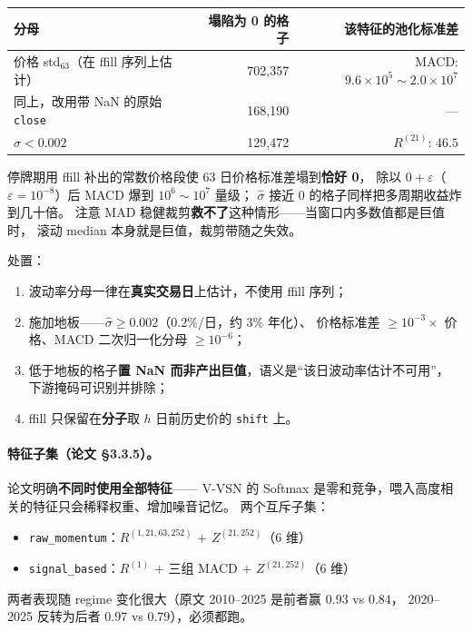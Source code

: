\documentclass[11pt, a4paper]{ctexart}
\newcommand{\file}[1]{\texttt{\small #1}}
\begin{document}
\begin{table}[h]
\centering
\small
\begin{tabular}{lrr}
\toprule
分母 & 塌陷为 0 的格子 & 该特征的池化标准差 \\
\midrule
价格 std$_{63}$（在 ffill 序列上估计） & 702{,}357 & MACD: $9.6\times10^5 \sim 2.0\times10^7$ \\
同上，改用带 NaN 的原始 \file{close} & 168{,}190 & --- \\
$\hat\sigma < 0.002$ & 129{,}472 & $R^{(21)}$: $46.5$ \\
\bottomrule
\end{tabular}
\end{table}

\noindent
停牌期用 ffill 补出的常数价格段使 63 日价格标准差塌到\textbf{恰好 0}，
除以 $0+\varepsilon$（$\varepsilon=10^{-8}$）后 MACD 爆到 $10^6\sim10^7$ 量级；
$\hat\sigma$ 接近 0 的格子同样把多周期收益炸到几十倍。
注意 MAD 稳健裁剪\textbf{救不了}这种情形——当窗口内多数值都是巨值时，
滚动 median 本身就是巨值，裁剪带随之失效。

\noindent 处置：
\begin{enumerate}[label=(\alph*)]
  \item 波动率分母一律在\textbf{真实交易日}上估计，不使用 ffill 序列；
  \item 施加地板——$\hat\sigma \ge 0.002$（$0.2\%$/日，约 $3\%$ 年化）、
        价格标准差 $\ge 10^{-3}\times$ 价格、MACD 二次归一化分母 $\ge 10^{-6}$；
  \item 低于地板的格子\textbf{置 NaN 而非产出巨值}，语义是“该日波动率估计不可用”，
        下游掩码可识别并排除；
  \item ffill 只保留在\textbf{分子}取 $h$ 日前历史价的 \file{shift} 上。
\end{enumerate}

\paragraph{特征子集（论文 §3.3.5）。}论文明确\textbf{不同时使用全部特征}——
V-VSN 的 Softmax 是零和竞争，喂入高度相关的特征只会稀释权重、增加噪音记忆。
两个互斥子集：
\begin{itemize}
  \item \texttt{raw\_momentum}：$R^{(1,21,63,252)}$ $+$ $Z^{(21,252)}$（6 维）
  \item \texttt{signal\_based}：$R^{(1)}$ $+$ 三组 MACD $+$ $Z^{(21,252)}$（6 维）
\end{itemize}
两者表现随 regime 变化很大（原文 2010--2025 是前者赢 $0.93$ vs $0.84$，
2020--2025 反转为后者 $0.97$ vs $0.79$），必须都跑。
\end{document}
